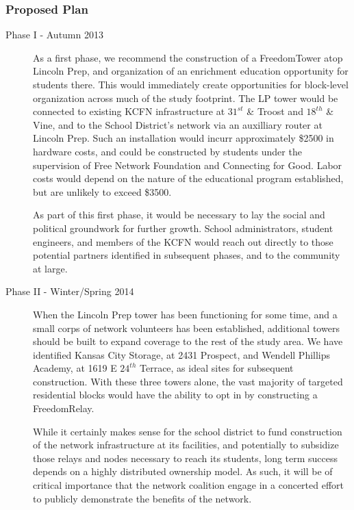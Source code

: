 \subsubsection{Proposed Plan}
\begin{description}
\item[Phase I - Autumn 2013]
As a first phase, we recommend the construction of a FreedomTower atop Lincoln
Prep, and organization of an enrichment education opportunity for
students there. This would immediately create opportunities for block-level
organization across much of the study footprint. The LP tower would be
connected to existing KCFN infrastructure at $31^{st}$ \& Troost and $18^{th}$
\& Vine, and to the School District's network via an auxilliary router at
Lincoln Prep. Such an installation would incurr approximately \$2500 in hardware
costs, and could be constructed by students under the supervision of Free
Network Foundation and Connecting for Good. Labor costs would depend on the
nature of the educational program established, but are unlikely to exceed \$3500. \par
As part of this first phase, it would be necessary to lay the social and
political groundwork for further growth. School administrators, student
engineers, and members of the KCFN would reach out directly to those potential
partners identified in subsequent phases, and to the community at large. \par

\item[Phase II - Winter/Spring 2014]
When the Lincoln Prep tower has been functioning for some time, and a small
corps of network volunteers has been established, additional towers should be
built to expand coverage to the rest of the study area. We have identified
Kansas City Storage, at 2431 Prospect, and Wendell Phillips Academy, at 1619 E
$24^{th}$ Terrace, as ideal sites for subsequent construction. With these three
towers alone, the vast majority of targeted residential blocks would have the
ability to opt in by constructing a FreedomRelay. \par
While it certainly makes sense for the school district to fund  construction
of the network infrastructure at its facilities, and potentially to subsidize
those relays and nodes necessary to reach its students, long term success
depends on a highly distributed ownership model. As such, it will be of critical
importance that the network coalition engage in a concerted 
effort to publicly demonstrate the benefits of the network.\par


\end{description}
